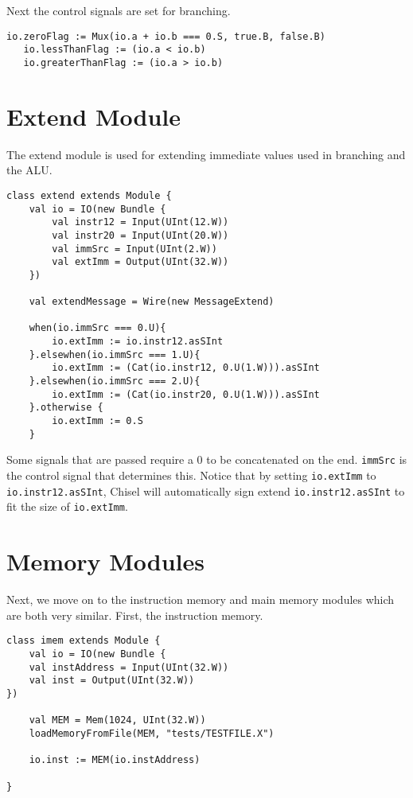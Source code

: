\documentclass[12pt, letterpaper]{report}
\begin{document}
\noindent Next the control signals are set for branching.

\begin{lstlisting}[style=scala]
   io.zeroFlag := Mux(io.a + io.b === 0.S, true.B, false.B)
   io.lessThanFlag := (io.a < io.b)
   io.greaterThanFlag := (io.a > io.b)
\end{lstlisting}




\section{Extend Module}
The extend module is used for extending immediate values used in branching and the ALU.

\begin{lstlisting}[style=scala]
   class extend extends Module {
    val io = IO(new Bundle {
        val instr12 = Input(UInt(12.W))
        val instr20 = Input(UInt(20.W))
        val immSrc = Input(UInt(2.W))
        val extImm = Output(UInt(32.W))
    })

    val extendMessage = Wire(new MessageExtend)
    
    when(io.immSrc === 0.U){
    	io.extImm := io.instr12.asSInt
    }.elsewhen(io.immSrc === 1.U){
    	io.extImm := (Cat(io.instr12, 0.U(1.W))).asSInt
    }.elsewhen(io.immSrc === 2.U){
    	io.extImm := (Cat(io.instr20, 0.U(1.W))).asSInt
    }.otherwise {
    	io.extImm := 0.S
    }
\end{lstlisting}    

Some signals that are passed require a 0 to be concatenated on the end. \verb|immSrc| is the control signal that determines this. Notice that by setting \verb|io.extImm| to \verb|io.instr12.asSInt|, Chisel will automatically sign extend \verb|io.instr12.asSInt| to fit the size of \verb|io.extImm|.

\section{Memory Modules}
Next, we move on to the instruction memory and main memory modules which are both very similar.
First, the instruction memory. 

\begin{lstlisting}[style=scala]
class imem extends Module {
    val io = IO(new Bundle {
	val instAddress = Input(UInt(32.W))
	val inst = Output(UInt(32.W))
})

	val MEM = Mem(1024, UInt(32.W))
	loadMemoryFromFile(MEM, "tests/TESTFILE.X")
	
	io.inst := MEM(io.instAddress)
    
}
\end{lstlisting}
\end{document}
